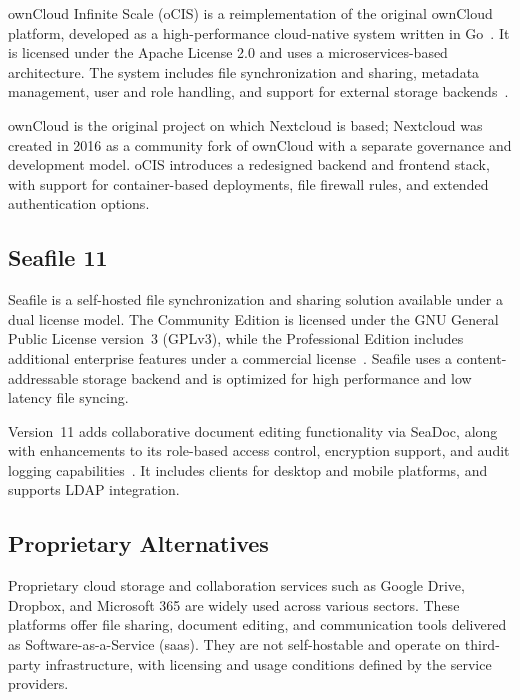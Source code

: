 ownCloud Infinite Scale (oCIS) is a reimplementation of the original ownCloud platform, developed as a high-performance cloud-native system written in Go~\cite{owncloud-docs}. It is licensed under the Apache License 2.0 and uses a microservices-based architecture. The system includes file synchronization and sharing, metadata management, user and role handling, and support for external storage backends~\cite{owncloud-news}.

ownCloud is the original project on which Nextcloud is based; Nextcloud was created in 2016 as a community fork of ownCloud with a separate governance and development model. oCIS introduces a redesigned backend and frontend stack, with support for container-based deployments, file firewall rules, and extended authentication options.

\subsection*{Seafile 11}

Seafile is a self-hosted file synchronization and sharing solution available under a dual license model. The Community Edition is licensed under the GNU General Public License version~3 (GPLv3), while the Professional Edition includes additional enterprise features under a commercial license~\cite{seafile-docs}. Seafile uses a content-addressable storage backend and is optimized for high performance and low latency file syncing.

Version~11 adds collaborative document editing functionality via SeaDoc, along with enhancements to its role-based access control, encryption support, and audit logging capabilities~\cite{seafile-forum}. It includes clients for desktop and mobile platforms, and supports LDAP integration.

\subsection*{Proprietary Alternatives}

Proprietary cloud storage and collaboration services such as Google Drive, Dropbox, and Microsoft 365 are widely used across various sectors. These platforms offer file sharing, document editing, and communication tools delivered as Software-as-a-Service (\gls{saas}). They are not self-hostable and operate on third-party infrastructure, with licensing and usage conditions defined by the service providers.

